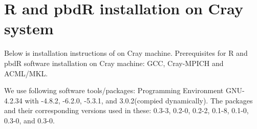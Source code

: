 \section{R and pbdR installation on Cray system }\label{sec:Rinstall}

Below is installation instructions of  on Cray machine. 
Prerequisites for R and pbdR software installation on Cray machine: GCC, Cray-MPICH and ACML/MKL.

We use following software tools/packages: Programming Environment GNU-4.2.34 with -4.8.2, -6.2.0, -5.3.1, and  3.0.2(compied dynamically). The  packages and their corresponding versions used in these:  0.3-3,  0.2-0,  0.2-2,  0.1-8,  0.1-0,  0.3-0, and  0.3-0.

